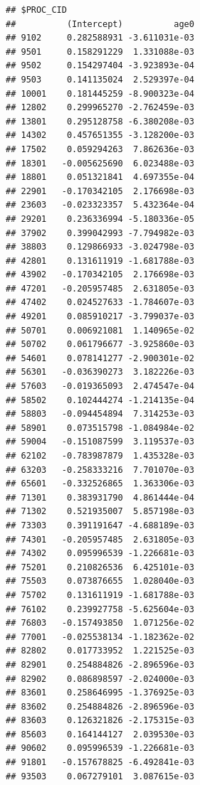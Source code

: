 \begin{frame}[fragile]

\small

\begin{Shaded}
\begin{Highlighting}[]
\end{Highlighting}
\end{Shaded}

\begin{verbatim}
## $PROC_CID
##          (Intercept)          age0
## 9102     0.282588931 -3.611031e-03
## 9501     0.158291229  1.331088e-03
## 9502     0.154297404 -3.923893e-04
## 9503     0.141135024  2.529397e-04
## 10001    0.181445259 -8.900323e-04
## 12802    0.299965270 -2.762459e-03
## 13801    0.295128758 -6.380208e-03
## 14302    0.457651355 -3.128200e-03
## 17502    0.059294263  7.862636e-03
## 18301   -0.005625690  6.023488e-03
## 18801    0.051321841  4.697355e-04
## 22901   -0.170342105  2.176698e-03
## 23603   -0.023323357  5.432364e-04
## 29201    0.236336994 -5.180336e-05
## 37902    0.399042993 -7.794982e-03
## 38803    0.129866933 -3.024798e-03
## 42801    0.131611919 -1.681788e-03
## 43902   -0.170342105  2.176698e-03
## 47201   -0.205957485  2.631805e-03
## 47402    0.024527633 -1.784607e-03
## 49201    0.085910217 -3.799037e-03
## 50701    0.006921081  1.140965e-02
## 50702    0.061796677 -3.925860e-03
## 54601    0.078141277 -2.900301e-02
## 56301   -0.036390273  3.182226e-03
## 57603   -0.019365093  2.474547e-04
## 58502    0.102444274 -1.214135e-04
## 58803   -0.094454894  7.314253e-03
## 58901    0.073515798 -1.084984e-02
## 59004   -0.151087599  3.119537e-03
## 62102   -0.783987879  1.435328e-03
## 63203   -0.258333216  7.701070e-03
## 65601   -0.332526865  1.363306e-03
## 71301    0.383931790  4.861444e-04
## 71302    0.521935007  5.857198e-03
## 73303    0.391191647 -4.688189e-03
## 74301   -0.205957485  2.631805e-03
## 74302    0.095996539 -1.226681e-03
## 75201    0.210826536  6.425101e-03
## 75503    0.073876655  1.028040e-03
## 75702    0.131611919 -1.681788e-03
## 76102    0.239927758 -5.625604e-03
## 76803   -0.157493850  1.071256e-02
## 77001   -0.025538134 -1.182362e-02
## 82802    0.017733952  1.221525e-03
## 82901    0.254884826 -2.896596e-03
## 82902    0.086898597 -2.024000e-03
## 83601    0.258646995 -1.376925e-03
## 83602    0.254884826 -2.896596e-03
## 83603    0.126321826 -2.175315e-03
## 85603    0.164144127  2.039530e-03
## 90602    0.095996539 -1.226681e-03
## 91801   -0.157678825 -6.492841e-03
## 93503    0.067279101  3.087615e-03

\end{verbatim}
\end{frame}
